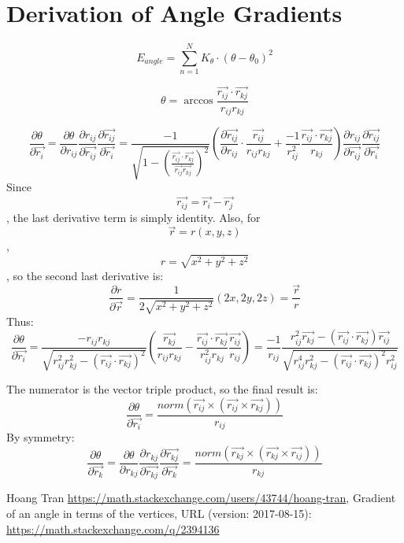 \section{Derivation of Angle Gradients}
\[E_{angle}=\sum_{n=1}^{N}K_{\theta}\cdot(\theta-\theta_{0})^2\]



\[\theta=\arccos{\frac{\vec{r_{ij}}\cdot\vec{r_{kj}}}{r_{ij} r_{kj}}}\]

\[\frac{\partial \theta}{\partial \vec{r_{i}}}=\frac{\partial \theta}{\partial r_{ij}}\frac{\partial r_{ij}}{\partial \vec{r_{ij}}}\frac{\partial \vec{r_{ij}}}{\partial \vec{r_{i}}}=\frac{-1}{\sqrt{1-(\frac{\vec{r_{ij}}\cdot\vec{r_{kj}}}{\vec{r_{ij}}\vec{r_{kj}}})^2}}(\frac{\partial \vec{r_{ij}}}{\partial r_{ij}}\cdot\frac{\vec{r_{ij}}}{r_{ij}r_{kj}}+\frac{-1}{r_{ij}^2}{\frac{\vec{r_{ij}}\cdot\vec{r_{kj}}}{r_{kj}}})\frac{\partial r_{ij}}{\partial \vec{r_{ij}}}\frac{\partial \vec{r_{ij}}}{\partial \vec{r_{i}}}\]
Since \[\vec{r_{ij}}=\vec{r_{i}}-\vec{r_{j}}\], the last derivative term is simply identity. Also, for \[\vec{r}=r(x,y,z)\],\[r=\sqrt{x^2+y^2+z^2}\], so the second last derivative is:
\[\frac{\partial r}{\partial \vec{r}}=\frac{1}{2\sqrt{x^2+y^2+z^2}}(2x, 2y,2z)=\frac{\vec{r}}{r}\]
Thus:
\[\frac{\partial \theta}{\partial \vec{r_{i}}}=\frac{-r_{ij}r_{kj}}{\sqrt{r_{ij}^2 r_{kj}^2-(\vec{r_{ij}}\cdot{\vec{r_{kj}}})^2}}(\frac{\vec{r_{kj}}}{r_{ij}r_{kj}}-\frac{\vec{r_{ij}}\cdot\vec{r_{kj}}}{r_{ij}^2 r_{kj}}\frac{\vec{r_{ij}}}{r_{ij}})=\frac{-1}{r_{ij}}\frac{r_{ij}^2 \vec{r_{kj}}-(\vec{r_{ij}}\cdot\vec{r_{kj}})\vec{r_{ij}}}{\sqrt{r_{ij}^4 r_{kj}^2-(\vec{r_{ij}}\cdot\vec{r_{kj}})^2 r_{ij}^2}}\]

The numerator is the vector triple product, so the final result is:
\[\frac{\partial \theta}{\partial \vec{r_{i}}}=\frac{norm(\vec{r_{ij}} \times (\vec{r_{ij}} \times \vec{r_{kj}}))}{r_{ij}}\]
By symmetry:
\[\frac{\partial \theta}{\partial \vec{r_{k}}}=\frac{\partial \theta}{\partial r_{kj}}\frac{\partial r_{kj}}{\partial \vec{r_{kj}}}\frac{\partial \vec{r_{kj}}}{\partial \vec{r_{k}}}=\frac{norm(\vec{r_{kj}} \times (\vec{r_{kj}} \times \vec{r_{ij}}))}{r_{kj}}\]

Hoang Tran \url{https://math.stackexchange.com/users/43744/hoang-tran}, Gradient of an angle in terms of the vertices, URL (version: 2017-08-15): \url{https://math.stackexchange.com/q/2394136}
